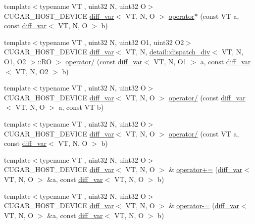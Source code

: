 \begin{DoxyCompactItemize}
\item 
{\footnotesize template$<$typename VT , uint32 N, uint32 O$>$ }\\C\+U\+G\+A\+R\+\_\+\+H\+O\+S\+T\+\_\+\+D\+E\+V\+I\+CE \hyperlink{structcugar_1_1diff__var}{diff\+\_\+var}$<$ VT, N, O $>$ \hyperlink{group___auto_diff_module_gab78c0e159eab94313c80fd6c78b5a0fd}{operator$\ast$} (const VT a, const \hyperlink{structcugar_1_1diff__var}{diff\+\_\+var}$<$ VT, N, O $>$ b)
\item 
{\footnotesize template$<$typename VT , uint32 N, uint32 O1, uint32 O2$>$ }\\C\+U\+G\+A\+R\+\_\+\+H\+O\+S\+T\+\_\+\+D\+E\+V\+I\+CE \hyperlink{structcugar_1_1diff__var}{diff\+\_\+var}$<$ VT, N, \hyperlink{structcugar_1_1detail_1_1dispatch__div}{detail\+::dispatch\+\_\+div}$<$ VT, N, O1, O2 $>$\+::RO $>$ \hyperlink{group___auto_diff_module_gad49a1e7cc916cd560facf38a498e0ea4}{operator/} (const \hyperlink{structcugar_1_1diff__var}{diff\+\_\+var}$<$ VT, N, O1 $>$ a, const \hyperlink{structcugar_1_1diff__var}{diff\+\_\+var}$<$ VT, N, O2 $>$ b)
\item 
{\footnotesize template$<$typename VT , uint32 N, uint32 O$>$ }\\C\+U\+G\+A\+R\+\_\+\+H\+O\+S\+T\+\_\+\+D\+E\+V\+I\+CE \hyperlink{structcugar_1_1diff__var}{diff\+\_\+var}$<$ VT, N, O $>$ \hyperlink{group___auto_diff_module_ga10ddb4877915c2ef70eb0555afa89169}{operator/} (const \hyperlink{structcugar_1_1diff__var}{diff\+\_\+var}$<$ VT, N, O $>$ a, const VT b)
\item 
{\footnotesize template$<$typename VT , uint32 N, uint32 O$>$ }\\C\+U\+G\+A\+R\+\_\+\+H\+O\+S\+T\+\_\+\+D\+E\+V\+I\+CE \hyperlink{structcugar_1_1diff__var}{diff\+\_\+var}$<$ VT, N, O $>$ \hyperlink{group___auto_diff_module_gac6d06651e3bd3b22fa763498852053dd}{operator/} (const VT a, const \hyperlink{structcugar_1_1diff__var}{diff\+\_\+var}$<$ VT, N, O $>$ b)
\item 
{\footnotesize template$<$typename VT , uint32 N, uint32 O$>$ }\\C\+U\+G\+A\+R\+\_\+\+H\+O\+S\+T\+\_\+\+D\+E\+V\+I\+CE \hyperlink{structcugar_1_1diff__var}{diff\+\_\+var}$<$ VT, N, O $>$ \& \hyperlink{group___auto_diff_module_ga93e04de8aa060923d0d031f83643b975}{operator+=} (\hyperlink{structcugar_1_1diff__var}{diff\+\_\+var}$<$ VT, N, O $>$ \&a, const \hyperlink{structcugar_1_1diff__var}{diff\+\_\+var}$<$ VT, N, O $>$ b)
\item 
{\footnotesize template$<$typename VT , uint32 N, uint32 O$>$ }\\C\+U\+G\+A\+R\+\_\+\+H\+O\+S\+T\+\_\+\+D\+E\+V\+I\+CE \hyperlink{structcugar_1_1diff__var}{diff\+\_\+var}$<$ VT, N, O $>$ \& \hyperlink{group___auto_diff_module_gab6673697063453e3a1805973fd2b3554}{operator-\/=} (\hyperlink{structcugar_1_1diff__var}{diff\+\_\+var}$<$ VT, N, O $>$ \&a, const \hyperlink{structcugar_1_1diff__var}{diff\+\_\+var}$<$ VT, N, O $>$ b)

\end{DoxyCompactItemize}
